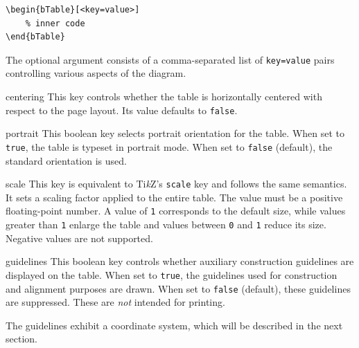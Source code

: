 \documentclass[11pt,a4paper]{ltxdoc}
\begin{document}
\begin{minipage}{.57\linewidth}
    \begin{bTable}[scale=.9]
    \end{bTable}
\end{minipage}
\begin{minipage}{.43\linewidth}
    \begin{verbatim}
\begin{bTable}[<key=value>]
    % inner code
\end{bTable}
    \end{verbatim}
\end{minipage}\medskip

The optional argument consists of a comma-separated list of \texttt{key=value} pairs controlling various aspects of the diagram.

\begin{macro}{centering}
    This key controls whether the table is horizontally centered with respect to the page layout. Its value defaults to \texttt{false}.
\end{macro}

\begin{macro}{portrait}
    This boolean key selects portrait orientation for the table. When set to \texttt{true}, the table is typeset in portrait mode. When set to \texttt{false} (default), the standard orientation is used.
\end{macro}

\begin{macro}{scale}
    This key is equivalent to Ti\textit{k}Z’s \texttt{scale} key and follows the same semantics. It sets a scaling factor applied to the entire table. The value must be a positive floating-point number. A value of \texttt{1} corresponds to the default size, while values greater than \texttt{1} enlarge the table and values between \texttt{0} and \texttt{1} reduce its size. Negative values are not supported.
\end{macro}

\begin{macro}{guidelines}
    This boolean key controls whether auxiliary construction guidelines are displayed on the table. When set to \texttt{true}, the guidelines used for construction and alignment purposes are drawn. When set to \texttt{false} (default), these guidelines are suppressed. These are \textit{not} intended for printing.

    \begin{bTable}
    \end{bTable}

    The guidelines exhibit a coordinate system, which will be described in the next section.
\end{macro}
\end{document}
